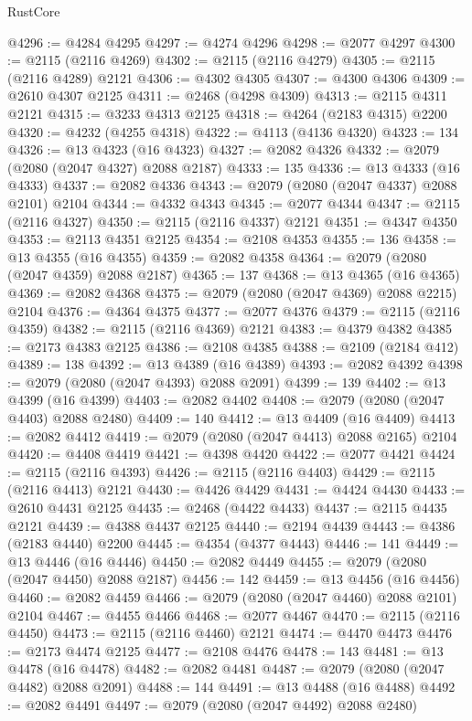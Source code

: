 \begin{lexlean}{RustCore}
\begin{coremodule}
@4296 := @4284 @4295
@4297 := @4274 @4296
@4298 := @2077 @4297
@4300 := @2115 (@2116 @4269)
@4302 := @2115 (@2116 @4279)
@4305 := @2115 (@2116 @4289) @2121
@4306 := @4302 @4305
@4307 := @4300 @4306
@4309 := @2610 @4307 @2125
@4311 := @2468 (@4298 @4309)
@4313 := @2115 @4311 @2121
@4315 := @3233 @4313 @2125
@4318 := @4264 (@2183 @4315) @2200
@4320 := @4232 (@4255 @4318)
@4322 := @4113 (@4136 @4320)
@4323 := 134
@4326 := @13 @4323 (@16 @4323)
@4327 := @2082 @4326
@4332 := @2079 (@2080 (@2047 @4327) @2088 @2187)
@4333 := 135
@4336 := @13 @4333 (@16 @4333)
@4337 := @2082 @4336
@4343 := @2079 (@2080 (@2047 @4337) @2088 @2101) @2104
@4344 := @4332 @4343
@4345 := @2077 @4344
@4347 := @2115 (@2116 @4327)
@4350 := @2115 (@2116 @4337) @2121
@4351 := @4347 @4350
@4353 := @2113 @4351 @2125
@4354 := @2108 @4353
@4355 := 136
@4358 := @13 @4355 (@16 @4355)
@4359 := @2082 @4358
@4364 := @2079 (@2080 (@2047 @4359) @2088 @2187)
@4365 := 137
@4368 := @13 @4365 (@16 @4365)
@4369 := @2082 @4368
@4375 := @2079 (@2080 (@2047 @4369) @2088 @2215) @2104
@4376 := @4364 @4375
@4377 := @2077 @4376
@4379 := @2115 (@2116 @4359)
@4382 := @2115 (@2116 @4369) @2121
@4383 := @4379 @4382
@4385 := @2173 @4383 @2125
@4386 := @2108 @4385
@4388 := @2109 (@2184 @412)
@4389 := 138
@4392 := @13 @4389 (@16 @4389)
@4393 := @2082 @4392
@4398 := @2079 (@2080 (@2047 @4393) @2088 @2091)
@4399 := 139
@4402 := @13 @4399 (@16 @4399)
@4403 := @2082 @4402
@4408 := @2079 (@2080 (@2047 @4403) @2088 @2480)
@4409 := 140
@4412 := @13 @4409 (@16 @4409)
@4413 := @2082 @4412
@4419 := @2079 (@2080 (@2047 @4413) @2088 @2165) @2104
@4420 := @4408 @4419
@4421 := @4398 @4420
@4422 := @2077 @4421
@4424 := @2115 (@2116 @4393)
@4426 := @2115 (@2116 @4403)
@4429 := @2115 (@2116 @4413) @2121
@4430 := @4426 @4429
@4431 := @4424 @4430
@4433 := @2610 @4431 @2125
@4435 := @2468 (@4422 @4433)
@4437 := @2115 @4435 @2121
@4439 := @4388 @4437 @2125
@4440 := @2194 @4439
@4443 := @4386 (@2183 @4440) @2200
@4445 := @4354 (@4377 @4443)
@4446 := 141
@4449 := @13 @4446 (@16 @4446)
@4450 := @2082 @4449
@4455 := @2079 (@2080 (@2047 @4450) @2088 @2187)
@4456 := 142
@4459 := @13 @4456 (@16 @4456)
@4460 := @2082 @4459
@4466 := @2079 (@2080 (@2047 @4460) @2088 @2101) @2104
@4467 := @4455 @4466
@4468 := @2077 @4467
@4470 := @2115 (@2116 @4450)
@4473 := @2115 (@2116 @4460) @2121
@4474 := @4470 @4473
@4476 := @2173 @4474 @2125
@4477 := @2108 @4476
@4478 := 143
@4481 := @13 @4478 (@16 @4478)
@4482 := @2082 @4481
@4487 := @2079 (@2080 (@2047 @4482) @2088 @2091)
@4488 := 144
@4491 := @13 @4488 (@16 @4488)
@4492 := @2082 @4491
@4497 := @2079 (@2080 (@2047 @4492) @2088 @2480)

\end{coremodule}
\end{lexlean}
